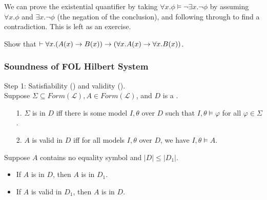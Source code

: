 \documentclass[english, 11pt]{article}
\begin{document}
  We can prove the existential quantifier by taking $\forall x. \phi \models \neg \exists x. \neg \phi$ by assuming $\forall x. \phi $ and $\exists x. \neg \phi$ (the negation of the conclusion), and following through to find a contradiction. This is left as an exercise.

  \begin{exmp}
    Show that $\vdash \forall x. (A(x) \rightarrow B(x)) \rightarrow (\forall x. A(x) \rightarrow \forall x. B(x))$.
    \begin{flagderiv}
    \end{flagderiv}
  \end{exmp}

  \subsubsection{Soundness of FOL Hilbert System}

  Step 1: Satisfiability () and validity (). \\

  Suppose $\Sigma \subseteq Form(\mathcal{L}), A \in Form(\mathcal{L})$, and $D$ is a .
  \begin{itemize}
    \item[1.] $\Sigma$ is  in $D$ iff there is some model $I, \theta$ over $D$ such that $I, \theta \models \varphi$ for all $\varphi \in \Sigma$.
    \item[2.] $A$ is valid in $D$ iff for all models $I,\theta$ over $D$, we have $I,\theta \models A$.
  \end{itemize}

  \begin{thrm}
    Suppose  $A$ contains no equality symbol and $|D| \leq |D_1|$.
    \begin{itemize}
      \item If $A$ is  in $D$, then $A$ is  in $D_1$.
      \item If $A$ is valid in $D_1$, then $A$ is  in $D$.
    \end{itemize}
  \end{thrm}
\end{document}
